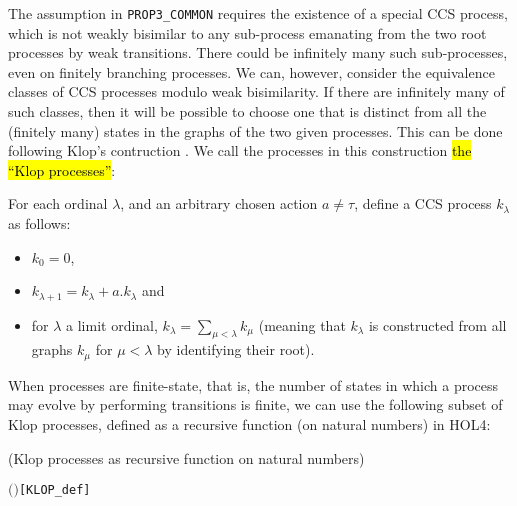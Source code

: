 The assumption in \texttt{PROP3_COMMON} requires the
existence of a special CCS process, which is not weakly bisimilar to
any sub-process emanating from the two root processes by weak
transitions.
There could be infinitely many such sub-processes, even on finitely
branching processes.
We can, however, consider the equivalence classes of CCS processes
modulo weak bisimilarity.
If there are infinitely many of such classes, 
then it will be 
possible to choose one  that is distinct from all the (finitely many) states in the
graphs of the two given processes.  
This can be done following Klop's contruction \cite{van2005characterisation}.
 We call  the processes in this construction \hl{the ``Klop processes''}:
\begin{definition}
For each ordinal $\lambda$, and an arbitrary chosen action $a \neq \tau$,
define a CCS process $k_\lambda$ as follows:
\begin{itemize}
\item $k_0 = 0$,
\item $k_{\lambda+1} = k_\lambda + a.k_\lambda$ and
\item for $\lambda$ a limit ordinal, $k_\lambda = \sum_{\mu < \lambda}
  k_\mu$ (meaning that $k_\lambda$ is constructed from all graphs
  $k_\mu$ for $\mu < \lambda$ by identifying their root).
\end{itemize}
\end{definition}
When processes are finite-state, that is,
the number of  states in which a process may evolve by performing
transitions is finite, 
we can use  the following subset of Klop processes, 
defined as a recursive function (on natural numbers) in HOL4:
\begin{definition}{(Klop processes as recursive function on natural numbers)}
\begin{alltt}
      \HOLTokenDefEquality{} 
     \ensuremath{(} \ensuremath{)} \HOLTokenDefEquality{}    \HOLSymConst{\ensuremath{+}}  \HOLSymConst{\ensuremath{\ldotp}}  \hfill{[KLOP_def]}
\end{alltt}
\end{definition}

